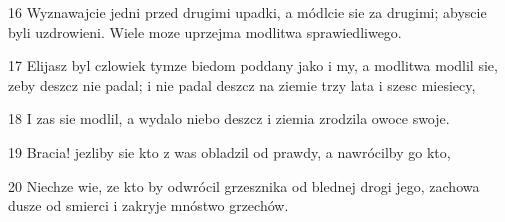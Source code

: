 \par 16 Wyznawajcie jedni przed drugimi upadki, a módlcie sie za drugimi; abyscie byli uzdrowieni. Wiele moze uprzejma modlitwa sprawiedliwego.
\par 17 Elijasz byl czlowiek tymze biedom poddany jako i my, a modlitwa modlil sie, zeby deszcz nie padal; i nie padal deszcz na ziemie trzy lata i szesc miesiecy,
\par 18 I zas sie modlil, a wydalo niebo deszcz i ziemia zrodzila owoce swoje.
\par 19 Bracia! jezliby sie kto z was obladzil od prawdy, a nawrócilby go kto,
\par 20 Niechze wie, ze kto by odwrócil grzesznika od blednej drogi jego, zachowa dusze od smierci i zakryje mnóstwo grzechów.


